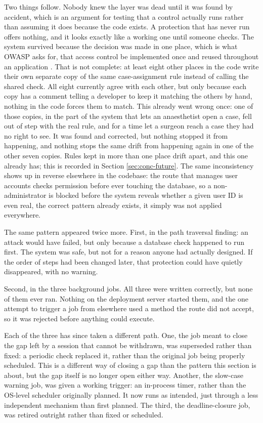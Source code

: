 Two things follow. Nobody knew the layer was dead until it was found by accident, which is an argument for testing that a control actually runs rather than assuming it does because the code exists. A protection that has never run offers nothing, and it looks exactly like a working one until someone checks. The system survived because the decision was made in one place, which is what OWASP asks for, that access control be implemented once and reused throughout an application \cite{owasp2021}. That is not complete: at least eight other places in the code write their own separate copy of the same case-assignment rule instead of calling the shared check. All eight currently agree with each other, but only because each copy has a comment telling a developer to keep it matching the others by hand, nothing in the code forces them to match. This already went wrong once: one of those copies, in the part of the system that lets an anaesthetist open a case, fell out of step with the real rule, and for a time let a surgeon reach a case they had no right to see. It was found and corrected, but nothing stopped it from happening, and nothing stops the same drift from happening again in one of the other seven copies. Rules kept in more than one place drift apart, and this one already has; this is recorded in Section \ref{sec:conc-future}. The same inconsistency shows up in reverse elsewhere in the codebase: the route that manages user accounts checks permission before ever touching the database, so a non-administrator is blocked before the system reveals whether a given user ID is even real, the correct pattern already exists, it simply was not applied everywhere.

The same pattern appeared twice more. First, in the path traversal finding: an attack would have failed, but only because a database check happened to run first. The system was safe, but not for a reason anyone had actually designed. If the order of steps had been changed later, that protection could have quietly disappeared, with no warning.

Second, in the three background jobs. All three were written correctly, but none of them ever ran. Nothing on the deployment server started them, and the one attempt to trigger a job from elsewhere used a method the route did not accept, so it was rejected before anything could execute.

Each of the three has since taken a different path. One, the job meant to close the gap left by a session that cannot be withdrawn, was superseded rather than fixed: a periodic check replaced it, rather than the original job being properly scheduled. This is a different way of closing a gap than the pattern this section is about, but the gap itself is no longer open either way. Another, the slow-case warning job, was given a working trigger: an in-process timer, rather than the OS-level scheduler originally planned. It now runs as intended, just through a less independent mechanism than first planned. The third, the deadline-closure job, was retired outright rather than fixed or scheduled.

